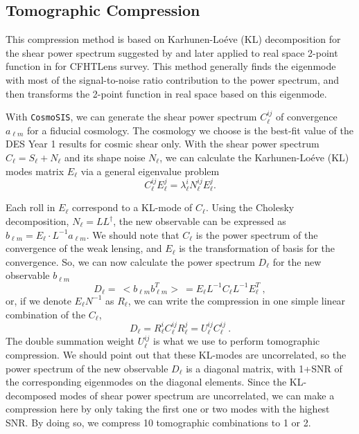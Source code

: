 \documentclass[twocolumn]{\docclass}
\newcommand\be{\begin{equation}}
\newcommand\ee{\end{equation}}
\begin{document}
	\subsection{Tomographic Compression}
	
	This compression method is based on Karhunen-Lo\'eve (KL) decomposition for the shear power spectrum suggested by \citep{Alonso:2017hhj} and later applied to real space 2-point function in \citep{Bellini:2019ssw} for CFHTLens survey. This method generally finds the eigenmode with most of the signal-to-noise ratio contribution to the power spectrum, and then transforms the 2-point function in real space based on this eigenmode.
	
	With  {\tt CosmoSIS}, we can generate the shear power spectrum $C_{\ell}^{ij}$ of convergence $a_{\ell m}$ for a fiducial cosmology. The cosmology we choose is the best-fit value of the DES Year 1 results for cosmic shear only. With the shear power spectrum $C_{\ell}=S_{\ell}+N_{\ell}$ and its shape noise $N_{\ell}$, we can calculate the Karhunen-Lo\'eve (KL) modes matrix $E_{\ell}$ via a general eigenvalue problem 
	\be
	C^{ij}_{\ell} E^j_{\ell} = \lambda^i_{\ell} N^{ij}_{\ell} E^j_{\ell}
	.\ee
	
	Each roll in $E_{\ell}$ correspond to a KL-mode of $C_{\ell}$. Using the Cholesky decomposition, $N_{\ell} = L L^{\dagger}$, the new observable can be expressed as $b_{\ell m} = E_{\ell} \cdot L^{-1} a_{\ell m}$. We should note that $C_{\ell}$ is the power spectrum of the convergence of the weak lensing, and $E_{\ell}$ is the transformation of basis for the convergence. So, we can now calculate the power spectrum $D_{\ell}$ for the new observable $b_{\ell m}$ 
	\be
	D_{\ell} =\ <b_{\ell m} b_{\ell m}^T>\ = E_{\ell} L^{-1} C_{\ell} L^{-1} E^{T}_{\ell}\
	,\ee
	or, if we denote $E_{\ell} N^{-1}$ as $R_{\ell}$, we can write the compression in one simple linear combination of the $C_{\ell}$,
	\be
	D_{\ell} = R_{\ell}^i C_{\ell}^{ij} R_{\ell}^j = U_{\ell}^{ij} C_{\ell}^{ij}\
	.\ee
	The double summation weight $U_{\ell}^{ij}$ is what we use to perform tomographic compression. We should point out that these KL-modes are uncorrelated, so the power spectrum of the new observable $D_{\ell}$ is a diagonal matrix, with 1+SNR of the corresponding eigenmodes on the diagonal elements. Since the KL-decomposed modes of shear power spectrum are uncorrelated, we can make a compression here by only taking the first one or two modes with the highest SNR. By doing so, we compress 10 tomographic combinations to 1 or 2.
	
\end{document}
